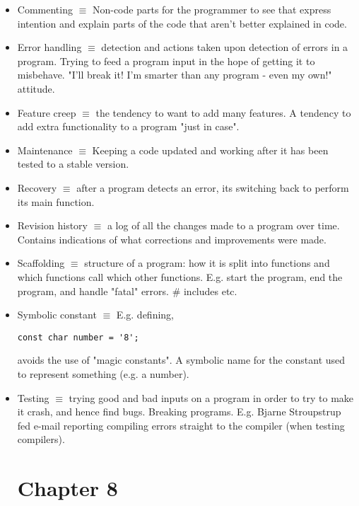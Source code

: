 \documentclass[12pt]{article}
\begin{document}
\begin{itemize}
\begin{lstlisting}
\end{lstlisting}

\item Commenting $\equiv$ Non-code parts for the programmer to see that express intention and explain parts of the code that aren't better explained in code.

\item Error handling $\equiv$ detection and actions taken upon detection of errors in a program. Trying to feed a program input in the hope of getting it to misbehave. "I'll break it! I'm smarter than any program - even my own!" attitude.

\item Feature creep $\equiv$ the tendency to want to add many features. A tendency to add extra functionality to a program "just in case".

\item Maintenance $\equiv$ Keeping a code updated and working after it has been tested to a stable version.

\item Recovery $\equiv$ after a program detects an error, its switching back to perform its main function.

\item Revision history $\equiv$ a log of all the changes made to a program over time. Contains indications of what corrections and improvements were made.

\item Scaffolding $\equiv$ structure of a program: how it is split into functions and which functions call which other functions. E.g. start the program, end the program, and handle "fatal" errors. \# includes etc.

\item Symbolic constant $\equiv$ E.g. defining,

\begin{lstlisting}
const char number = '8';
\end{lstlisting}

avoids the use of "magic constants". A symbolic name for the constant used to represent something (e.g. a number).

\item Testing $\equiv$ trying good and bad inputs on a program in order to try to make it crash, and hence find bugs. Breaking programs. E.g. Bjarne Stroupstrup fed e-mail reporting compiling errors straight to the compiler (when testing compilers).

\section*{Chapter 8}


\end{itemize}
\end{document}
